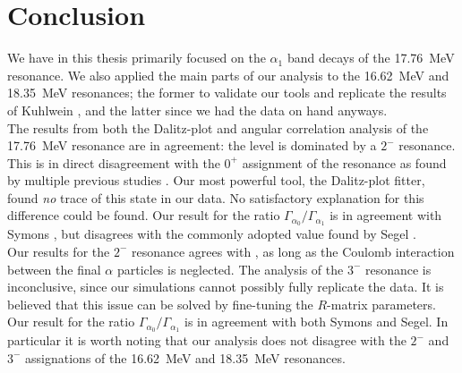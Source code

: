 \section{Conclusion}
We have in this thesis primarily focused on the $\alpha_1$ band decays of the  \SI{17.76}{MeV} resonance. We also applied the main parts of our analysis to the \SI{16.62}{MeV} and \SI{18.35}{MeV} resonances; the former to validate our tools and replicate the results of Kuhlwein \cite{Kuhlwein}, and the latter since we had the data on hand anyways. \\

The results from both the Dalitz-plot and angular correlation analysis of the \SI{17.76}{MeV} resonance are in agreement: the level is dominated by a $2^-$ resonance. This is in direct disagreement with the $0^+$ assignment of the resonance as found by multiple previous studies \cite{Symons}\cite{Segel}\cite{Hanna}\cite{Munch}. Our most powerful tool, the Dalitz-plot fitter, found \textit{no} trace of this state in our data. No satisfactory explanation for this difference could be found. Our result for the ratio $\Gamma_{\alpha_0}/\Gamma_{\alpha_1}$ is in agreement with Symons \cite{Symons}, but disagrees with the commonly adopted value found by Segel \cite{Segel}. \\

Our results for the $2^-$ resonance agrees with \cite{Kuhlwein}, as long as the Coulomb interaction between the final $\alpha$ particles is neglected. The analysis of the $3^-$ resonance is inconclusive, since our simulations cannot possibly fully replicate the data. It is believed that this issue can be solved by fine-tuning the $R$-matrix parameters. Our result for the ratio $\Gamma_{\alpha_0}/\Gamma_{\alpha_1}$ is in agreement with both Symons and Segel. In particular it is worth noting that our analysis does not disagree with the $2^-$ and $3^-$ assignations of the \SI{16.62}{MeV} and \SI{18.35}{MeV} resonances. 